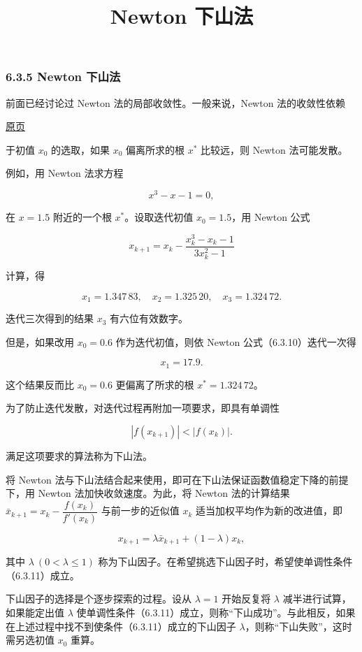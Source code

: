 \documentclass[
  10pt,
  fontset=fandol]{ctexart}
\title{Newton 下山法}
\author{}
\date{}
\begin{document}
\maketitle

\subsubsection{6.3.5 Newton 下山法}\label{newton-ux4e0bux5c71ux6cd5}

前面已经讨论过 Newton 法的局部收敛性。一般来说，Newton 法的收敛性依赖

\href{../../source-images/pdf-167.jpeg}{原页}

于初值 \(x_0\) 的选取，如果 \(x_0\) 偏离所求的根 \(x^*\) 比较远，则 Newton 法可能发散。

例如，用 Newton 法求方程

\[
x^3-x-1=0,
\tag{6.3.9}
\]

在 \(x=1.5\) 附近的一个根 \(x^*\)。设取迭代初值 \(x_0=1.5\)，用 Newton 公式

\[
x_{k+1}=x_k-\frac{x_k^3-x_k-1}{3x_k^2-1}
\tag{6.3.10}
\]

计算，得

\[
x_1=1.347\,83,\quad x_2=1.325\,20,\quad x_3=1.324\,72.
\]

迭代三次得到的结果 \(x_3\) 有六位有效数字。

但是，如果改用 \(x_0=0.6\) 作为迭代初值，则依 Newton 公式（6.3.10）迭代一次得

\[
x_1=17.9.
\]

这个结果反而比 \(x_0=0.6\) 更偏离了所求的根 \(x^*=1.324\,72\)。

为了防止迭代发散，对迭代过程再附加一项要求，即具有单调性

\[
|f(x_{k+1})|<|f(x_k)|.
\tag{6.3.11}
\]

满足这项要求的算法称为下山法。

将 Newton 法与下山法结合起来使用，即可在下山法保证函数值稳定下降的前提下，用 Newton 法加快收敛速度。为此，将 Newton 法的计算结果 \(\bar{x}_{k+1}=x_k-\dfrac{f(x_k)}{f'(x_k)}\) 与前一步的近似值 \(x_k\) 适当加权平均作为新的改进值，即

\[
x_{k+1}=\lambda\bar{x}_{k+1}+(1-\lambda)x_k,
\tag{6.3.12}
\]

其中 \(\lambda\ (0<\lambda\leqslant1)\) 称为下山因子。在希望挑选下山因子时，希望使单调性条件（6.3.11）成立。

下山因子的选择是个逐步探索的过程。设从 \(\lambda=1\) 开始反复将 \(\lambda\) 减半进行试算，如果能定出值 \(\lambda\) 使单调性条件（6.3.11）成立，则称``下山成功''。与此相反，如果在上述过程中找不到使条件（6.3.11）成立的下山因子 \(\lambda\)，则称``下山失败''，这时需另选初值 \(x_0\) 重算。
\end{document}
